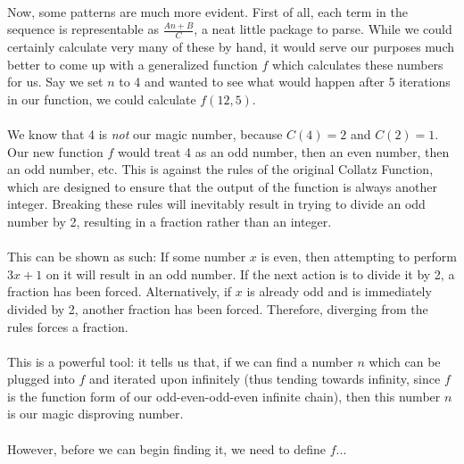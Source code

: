 \documentclass[12pt,letterpaper]{article}
\begin{document}
			\newpage %
		
			\paragraph{} Now, some patterns are much more evident. First of all, each term in the sequence is representable as $\frac{An + B}{C}$, a neat little package to parse. While we could certainly calculate very many of these by hand, it would serve our purposes much better to come up with a generalized function $f$ which calculates these numbers for us. Say we set $n$ to 4 and wanted to see what would happen after 5 iterations in our function, we could calculate $f(12, 5)$.
			
			\paragraph{} We know that 4 is \textit{not} our magic number, because $C(4) = 2$ and $C(2) = 1$. Our new function $f$ would treat 4 as an odd number, then an even number, then an odd number, etc. This is against the rules of the original Collatz Function, which are designed to ensure that the output of the function is always another integer. Breaking these rules will inevitably result in trying to divide an odd number by 2, resulting in a fraction rather than an integer. 
			
			\paragraph{} This can be shown as such: If some number $x$ is even, then attempting to perform $3x+1$ on it will result in an odd number. If the next action is to divide it by 2, a fraction has been forced. Alternatively, if $x$ is already odd and is immediately divided by 2, another fraction has been forced. Therefore, diverging from the rules forces a fraction.
			
			\paragraph{} This is a powerful tool: it tells us that, if we can find a number $n$ which can be plugged into $f$ and iterated upon infinitely (thus tending towards infinity, since $f$ is the function form of our odd-even-odd-even infinite chain), then this number $n$ is our magic disproving number.
			
			\paragraph{} However, before we can begin finding it, we need to define $f$...
			
\end{document}
